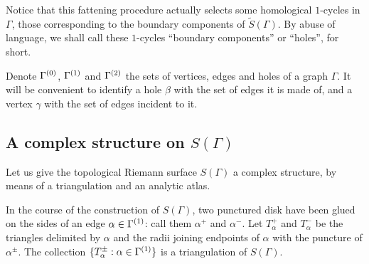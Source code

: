 Notice that this fattening procedure actually selects some homological
$1$-cycles in $\Gamma$, those corresponding to the boundary components of
$\tilde S(\Gamma)$. By abuse of language, we shall call these $1$-cycles
``boundary components'' or ``holes'', for short.

Denote $\Gamma^{(0)}$, $\Gamma^{(1)}$ and $\Gamma^{(2)}$ the
sets of vertices, edges and holes of a graph $\Gamma$. It will be
convenient to identify a hole $\beta$ with the set of edges it is made
of, and a vertex $\gamma$ with the set of edges incident to it.


\subsection{A complex structure on $S(\Gamma)$}
\label{sec:atlas}
Let us give the topological Riemann surface $S(\Gamma)$ a complex
structure, by means of a triangulation and an analytic atlas.

In the course of the construction of $S(\Gamma)$, two punctured disk
have been glued on the sides of an edge $\alpha \in \Gamma^{(1)}$: call
them $\alpha^+$ and $\alpha^-$. Let $T_\alpha^+$ and $T_\alpha^-$ be the triangles
delimited by $\alpha$ and the radii joining endpoints of $\alpha$ with the
puncture of $\alpha^\pm$. The collection $\{T_\alpha^\pm : \alpha \in \Gamma^{(1)}\}$
is a triangulation of $S(\Gamma)$.

